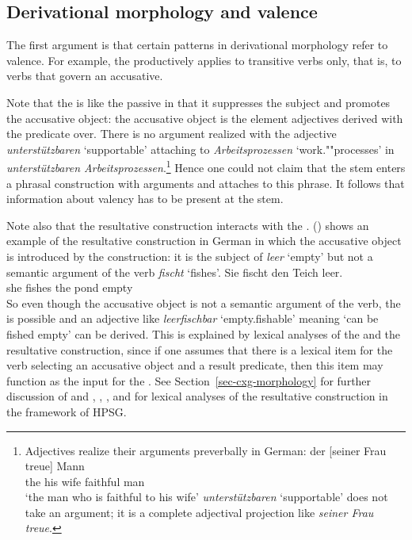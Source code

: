 \documentclass[output=paper
	        ,collection
	        ,collectionchapter
 	        ,biblatex
                ,babelshorthands
                ,newtxmath
                ,draftmode
                ,colorlinks, citecolor=brown
]{langscibook}
\begin{document}
\subsection{Derivational morphology and valence} 

The first argument \citep[Section~5.5.1]{MuellerGT-Eng1} is that certain patterns in derivational morphology refer to valence. For
example, the \bard productively applies to transitive verbs only, that is, to verbs that govern an accusative.
\eal
{}
\zl
\begin{sloppypar}
\noindent
Note that the \bard is like the passive in that it suppresses the subject and promotes the accusative object: the
accusative object is the element adjectives derived with the \bard predicate over. There is no argument
realized with the adjective \emph{unterstützbaren} `supportable' attaching to \emph{Arbeitsprozessen} `work.""processes' in \emph{unterstützbaren
  Arbeitsprozessen}.\footnote{
Adjectives realize their arguments preverbally in German:
\ea
\gll der [seiner Frau treue] Mann\\
     the \spacebr{}his wife faithful man\\
\glt `the man who is faithful to his wife'
\z
\emph{unterstützbaren} `supportable' does not take an argument; it is a complete adjectival projection like \emph{seiner Frau treue}.
}  Hence one could not claim that the stem enters a phrasal construction with arguments and
 attaches to this phrase. It follows that information about valency has to be present at
the stem. 
\end{sloppypar}

Note also that the resultative construction interacts with the \bard. () shows an example of the resultative
construction in German in which the accusative object is introduced by the construction: it is the subject of
\emph{leer} `empty' but not a semantic argument of the verb \emph{fischt} `fishes'.
\ea
\gll Sie fischt den Teich leer.\\
     she fishes the pond empty\\
\z
So even though the accusative object is not a semantic argument of the verb, the \bard is possible
and an adjective like \emph{leerfischbar} `empty.fishable' meaning `can be fished empty' can be derived. This is explained by lexical analyses of
the \bard and the resultative construction, since if one assumes that there is a lexical item for
the verb  selecting an accusative object and a result predicate, then this item may function as
the input for the \bard. See Section~\ref{sec-cxg-morphology} for further discussion of \bard and
 \citet{Verspoor97a}, \citet{Wechsler97a}, \citet{WN2001a}, and \citet[Chapter~5]{Mueller2002b} for lexical analyses of the resultative construction in the framework of HPSG.
\end{document}
